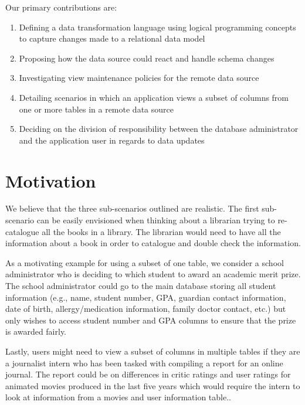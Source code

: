 \documentclass[12pt]{article}
\begin{document}
\noindent Our primary contributions are:
\begin{enumerate}
	\item{Defining a data transformation language using logical programming concepts to capture changes made to a relational data model}
	\item{Proposing how the data source could react and handle schema changes}
	\item{Investigating view maintenance policies for the remote data source}
	\item{Detailing scenarios in which an application views a subset of columns from one or more tables in a remote data source}
	\item{Deciding on the division of responsibility between the database administrator and the application user in regards to data updates}
\end{enumerate}

\section{Motivation}
\label{sec:motivation}
We believe that the three sub-scenarios outlined are realistic. The first sub-scenario can be easily envisioned when thinking about a librarian trying to re-catalogue all the books in a library. The librarian would need to have all the information about a book in order to catalogue and double check the information.

As a motivating example for using a subset of one table, we consider a school administrator who is deciding to which student to award an academic merit prize.  The school administrator could go to the main database storing all student information (e.g., name, student number, GPA, guardian contact information, date of birth, allergy/medication information, family doctor contact, etc.) but only wishes to access student number and GPA columns to ensure that the prize is awarded fairly.

Lastly, users might need to view a subset of columns in multiple tables if they are a journalist intern who has been tasked with compiling a report for an online journal. The report could be on differences in critic ratings and user ratings for animated movies produced in the last five years which would require the intern to look at information from a movies and user information table.. 
\end{document}
